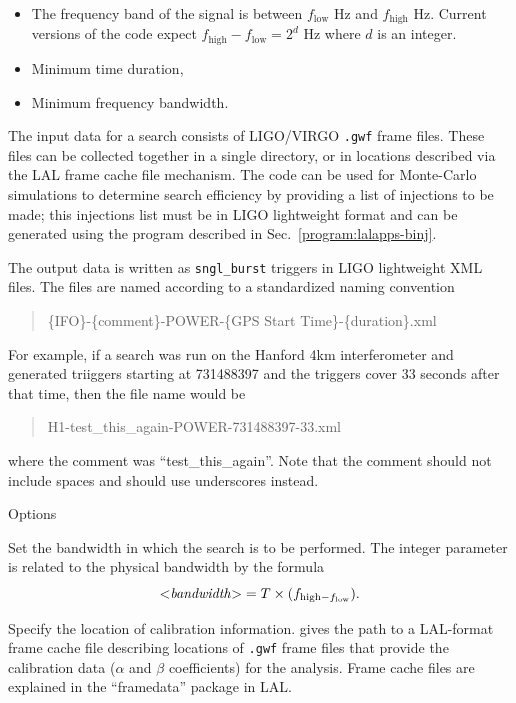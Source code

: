\begin{entry}
\begin{itemize}
\item The frequency band of the signal is between $f_{\mathrm{low}}$ Hz and
${f_{\mathrm{high}}}$ Hz.  Current versions of the code expect
${f_{\mathrm{high}}}-{f_{\mathrm{low}}}=2^d$ Hz where $d$ is an integer. 

\item Minimum time duration,

\item Minimum frequency bandwidth.
\end{itemize}

The input data for a search consists of LIGO/VIRGO \texttt{.gwf} frame
files.  These files can be collected together in a single directory, or in
locations described via the LAL frame cache file mechanism.  The code can
be used for Monte-Carlo simulations to determine search efficiency by
providing a list of injections to be made;  this injections list must be in
LIGO lightweight format and can be generated using the 
program described in Sec.~\ref{program:lalapps-binj}. 

The output data is written as \verb|sngl_burst| triggers in LIGO
lightweight XML files.  The files are named according to a standardized
naming convention
\begin{quote}
\{IFO\}-\{comment\}-POWER-\{GPS Start Time\}-\{duration\}.xml
\end{quote}
For example, if a search was run on the Hanford 4km interferometer and
generated triiggers starting at 731488397 and the triggers cover 33 seconds
after that time,  then the file name would be 
\begin{quote}
H1-test\_this\_again-POWER-731488397-33.xml
\end{quote}
where the comment was ``test\_this\_again''.  Note that the comment should
not include spaces and should use underscores instead.

\item[Options]\leavevmode
\begin{entry}
\item[\option{--bandwidth} \parm{bandwidth}]
Set the bandwidth in which the search is to be performed.  The integer
parameter  is related to the physical bandwidth by the
formula
\[
\mbox{$<$\textit{bandwidth}$>$}
   = T \times (f_{\mathrm{high} - f_{\mathrm{low}}}).
\]

\item[\option{--calibration-cache} \parm{cache file}]
Specify the location of calibration information.   gives
the path to a LAL-format frame cache file describing locations of
\texttt{.gwf} frame files that provide the calibration data ($\alpha$ and
$\beta$ coefficients) for the analysis.  Frame cache files are explained in
the ``framedata'' package in LAL.


\end{entry}
\end{entry}
